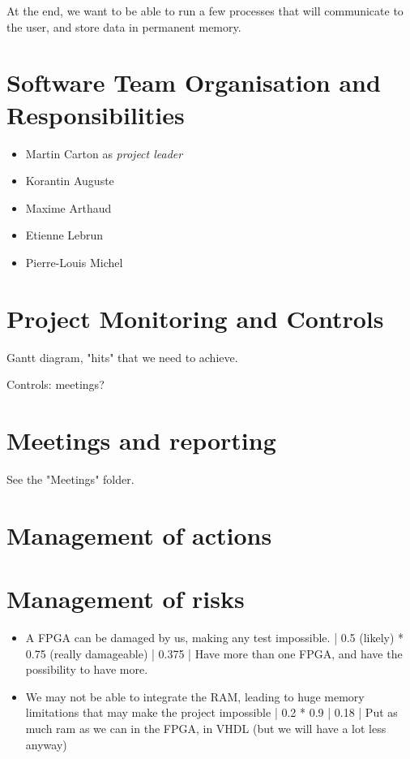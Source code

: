 \documentclass{article}
\begin{document}
    At the end, we want to be able to run a few processes that will communicate
    to the user, and store data in permanent memory.

  \section{Software Team Organisation and Responsibilities}
    \begin{itemize}
      \item Martin Carton as \textit{project leader}
      \item Korantin Auguste
      \item Maxime Arthaud
      \item Etienne Lebrun
      \item Pierre-Louis Michel
    \end{itemize}

  \section{Project Monitoring and Controls}
    \afterpage{}

    Gantt diagram, "hits" that we need to achieve.

    Controls: meetings?

  \section{Meetings and reporting}
    See the "Meetings" folder.

  \section{Management of actions}

  \section{Management of risks}
    \begin{itemize}
      \item A FPGA can be damaged by us, making any test impossible. | 0.5
        (likely) * 0.75 (really damageable) | 0.375 | Have more than one FPGA,
        and have the possibility to have more.
      \item We may not be able to integrate the RAM, leading to huge memory
        limitations that may make the project impossible | 0.2 * 0.9 | 0.18 |
        Put as much ram as we can in the FPGA, in VHDL (but we will have a lot
        less anyway)
    \end{itemize}
\end{document}
